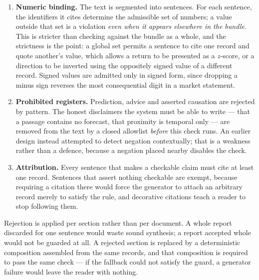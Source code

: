 \begin{enumerate}
  \item \textbf{Numeric binding.} The text is segmented into sentences. For each sentence, the
        identifiers it cites determine the admissible set of numbers; a value outside that set is a
        violation \emph{even when it appears elsewhere in the bundle}. This is stricter than checking
        against the bundle as a whole, and the strictness is the point: a global set permits a
        sentence to cite one record and quote another's value, which allows a return to be presented
        as a $z$-score, or a direction to be inverted using the oppositely signed value of a
        different record. Signed values are admitted only in signed form, since dropping a minus
        sign reverses the most consequential digit in a market statement.
  \item \textbf{Prohibited registers.} Prediction, advice and asserted causation are rejected by
        pattern. The honest disclaimers the system must be able to write --- that a passage contains
        no forecast, that proximity is temporal only --- are removed from the text by a closed
        allowlist \emph{before} this check runs. An earlier design instead attempted to detect
        negation contextually; that is a weakness rather than a defence, because a negation placed
        nearby disables the check.
  \item \textbf{Attribution.} Every sentence that makes a checkable claim must cite at least one
        record. Sentences that assert nothing checkable are exempt, because requiring a citation
        there would force the generator to attach an arbitrary record merely to satisfy the rule, and
        decorative citations teach a reader to stop following them.
\end{enumerate}

Rejection is applied per section rather than per document. A whole report discarded for one sentence
would waste sound synthesis; a report accepted whole would not be guarded at all. A rejected section
is replaced by a deterministic composition assembled from the same records, and that composition is
required to pass the same check --- if the fallback could not satisfy the guard, a generator failure
would leave the reader with nothing.


